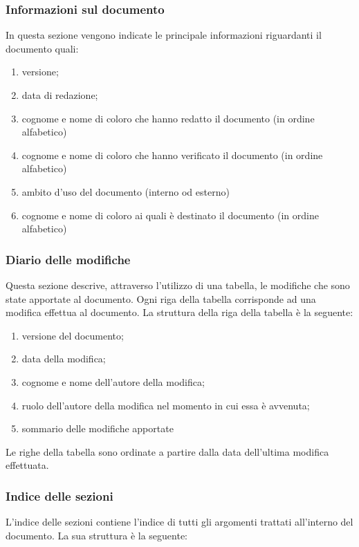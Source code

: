 \documentclass[../NormeProgetto.tex]{subfiles}
\begin{document}
		\subsubsection{Informazioni sul documento}
		In questa sezione vengono indicate le principale informazioni riguardanti il documento quali:
		\begin{enumerate}
		\item versione;
		\item data di redazione;
		\item cognome e nome di coloro che hanno redatto il documento (in ordine alfabetico)
		\item cognome e nome di coloro che hanno verificato il documento (in ordine alfabetico)
		\item ambito d'uso del documento (interno od esterno)
		\item cognome e nome di coloro ai quali è destinato il documento (in ordine alfabetico)
		\end{enumerate}

		\subsubsection{Diario delle modifiche}
		Questa sezione descrive, attraverso l'utilizzo di una tabella, le modifiche che sono state apportate al documento. Ogni riga della tabella corrisponde ad una modifica effettua al documento. La struttura della riga della tabella è la seguente:

		\begin{enumerate}
		\item versione del documento;
		\item data della modifica;
		\item cognome e nome dell'autore della modifica;
		\item ruolo dell'autore della modifica nel momento in cui essa è avvenuta;
		\item sommario delle modifiche apportate
		\end{enumerate}

		Le righe della tabella sono ordinate a partire dalla data dell'ultima modifica effettuata.

		\subsubsection{Indice delle sezioni}
		L'indice delle sezioni contiene l'indice di tutti gli argomenti trattati all'interno del documento. La sua struttura è la seguente:
\end{document}
